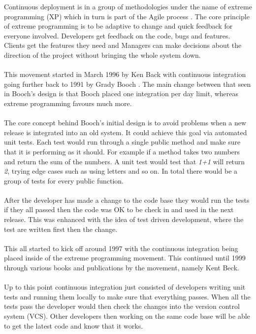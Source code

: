 Continuous deployment is in a group of methodologies under the name of extreme programming (XP) which in turn is part of the Agile process \citep{XP}. The core principle of extreme programming is to be adaptive to change and quick feedback for everyone involved. Developers get feedback on the code, bugs and features. Clients get the features they need and Managers can make decisions about the direction of the project without bringing the whole system down. \citep{mf}
\\\\
This movement started in March 1996 by Ken Back \citep{XPH} with continuous integration going further back to 1991 by Grady Booch \citep{CIF}. The main change between that seen in Booch's design is that Booch placed one integration per day limit, whereas extreme programming favours much more.
\\\\
The core concept behind Booch's initial design is to avoid problems when a new release is integrated into an old system. It could achieve this goal via automated unit tests. Each test would run through a single public method and make sure that it is performing as it should. For example if a method takes two numbers and return the sum of the numbers. A unit test would test that \textit{1+1} will return \textit{2}, trying edge cases such as using letters and so on. In total there would be a group of tests for every public function. \citep{unit_tests}
\\\\
After the developer has made a change to the code base they would run the tests if they all passed then the code was OK to be check in and used in the next release. This was enhanced with the idea of test driven development, where the test are written first then the change.
\\\\
This all started to kick off around 1997 with the continuous integration being placed inside of the extreme programming movement.  This continued until 1999 through various books and publications by the movement, namely Kent Beck. \citep{CIF}
\\\\
Up to this point continuous integration just consisted of developers writing unit tests and running them locally to make sure that everything passes. When all the tests pass the developer would then check the changes into the version control system (VCS). Other developers then working on the same code base will be able to get the latest code and know that it works.
